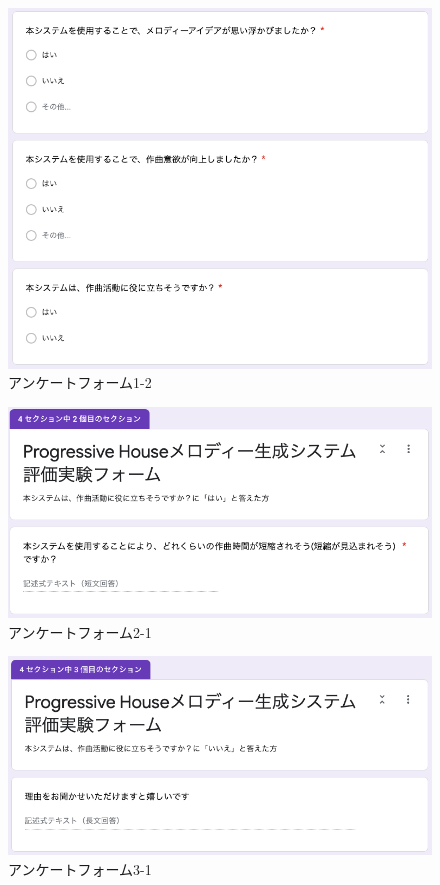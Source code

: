 \begin{figure}[htbp]
	\begin{center}
		\includegraphics[width=14.5cm]{image/forms/form2.png}
		\caption{アンケートフォーム1-2}
	\end{center}
\end{figure}

\begin{figure}[htbp]
	\begin{center}
		\includegraphics[width=14.5cm]{image/forms/form3.png}
		\caption{アンケートフォーム2-1}
	\end{center}
\end{figure}

\begin{figure}[htbp]
	\begin{center}
		\includegraphics[width=14.5cm]{image/forms/form4.png}
		\caption{アンケートフォーム3-1}
	\end{center}
\end{figure}

